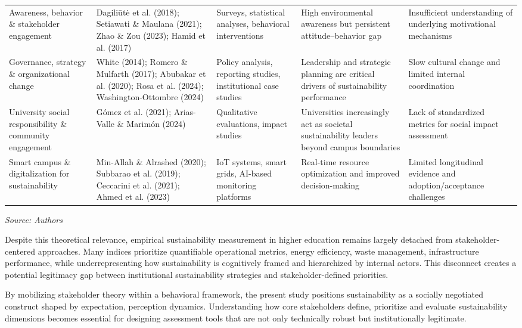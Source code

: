 \documentclass[12pt,a4paper]{article}
\begin{document}
\begin{longtable}{p{3cm} p{4cm} p{3cm} p{3cm} p{3cm}}
Awareness, behavior \& stakeholder engagement &
Dagiliūtė et al. (2018); Setiawati \& Maulana (2021); 
Zhao \& Zou (2023); Hamid et al. (2017) &
Surveys, statistical analyses, behavioral interventions &
High environmental awareness but persistent attitude–behavior gap &
Insufficient understanding of underlying motivational mechanisms \\

Governance, strategy \& organizational change &
White (2014); Romero \& Mulfarth (2017); 
Abubakar et al. (2020); Rosa et al. (2024); 
Washington-Ottombre (2024) &
Policy analysis, reporting studies, institutional case studies &
Leadership and strategic planning are critical drivers of sustainability performance &
Slow cultural change and limited internal coordination \\

University social responsibility \& community engagement &
Gómez et al. (2021); Arias-Valle \& Marimón (2024) &
Qualitative evaluations, impact studies &
Universities increasingly act as societal sustainability leaders beyond campus boundaries &
Lack of standardized metrics for social impact assessment \\

Smart campus \& digitalization for sustainability &
Min-Allah \& Alrashed (2020); Subbarao et al. (2019); 
Ceccarini et al. (2021); Ahmed et al. (2023) &
IoT systems, smart grids, AI-based monitoring platforms &
Real-time resource optimization and improved decision-making &
Limited longitudinal evidence and adoption/acceptance challenges \\

\hline
\end{longtable}

\noindent\textit{Source: Authors}


Despite this theoretical relevance, empirical sustainability measurement in higher education remains largely detached from stakeholder-centered approaches. Many indices prioritize quantifiable operational metrics, energy efficiency, waste management, infrastructure performance, while underrepresenting how sustainability is cognitively framed and hierarchized by internal actors. This disconnect creates a potential legitimacy gap between institutional sustainability strategies and stakeholder-defined priorities.

By mobilizing stakeholder theory within a behavioral framework, the present study positions sustainability as a socially negotiated construct shaped by expectation, perception dynamics. Understanding how core stakeholders define, prioritize and evaluate sustainability dimensions becomes essential for designing assessment tools that are not only technically robust but institutionally legitimate.
\end{document}
